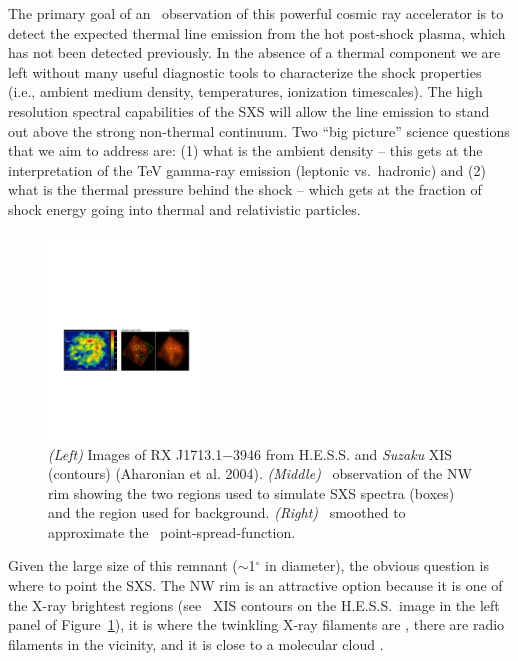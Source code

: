 \documentclass[11pt,a4paper]{article}
\begin{document}
{The primary goal of an \ah\ observation of this powerful cosmic ray accelerator is to detect the expected thermal line
emission from the hot post-shock plasma, which has not been detected
previously.  In the absence of a thermal component we are left without
many useful diagnostic tools to characterize the shock properties
(i.e., ambient medium density, temperatures, ionization timescales).
The high resolution spectral capabilities of the SXS will
allow the line emission to stand out above the strong non-thermal
continuum.  Two ``big picture'' science questions that we aim to
address are: (1) what is the ambient density -- this gets at the
interpretation of the TeV gamma-ray emission (leptonic vs.\ hadronic)
and (2) what is the thermal pressure behind the shock -- which gets at
the fraction of shock energy going into thermal and relativistic
particles.

\begin{figure}[h]
\begin{center}
    \vspace{-0.25in}
\includegraphics[height=2.15in,clip,trim=60 265 60 360]{RXJ1713_images}
\normalsize
\caption{{\it (Left)} Images of RX J1713.1$-$3946 from H.E.S.S.  and
  {\it Suzaku} XIS (contours) (Aharonian et al. 2004).  {\it (Middle)} \chandra\ observation
  of the NW rim showing the two regions used to simulate SXS spectra
  (boxes) and the region used for background.  {\it (Right)}
  \chandra\ smoothed to approximate the \ah\ point-spread-function.}
\label{fig:rxjimages}
\end{center}
\end{figure}

Given the large size of this remnant ($\sim$1$^\circ$ in diameter),
the obvious question is where to point the SXS.  The NW rim is an
attractive option because it is one of the X-ray brightest regions
(see \suzaku\ XIS contours on the H.E.S.S.\ image in the left panel of
Figure~\ref{fig:rxjimages}), it is where the twinkling X-ray filaments
are \citep{Uchiyama07}, there are radio filaments in the vicinity, and
it is close to a molecular cloud \citep{slane99}.  

}
\end{document}
